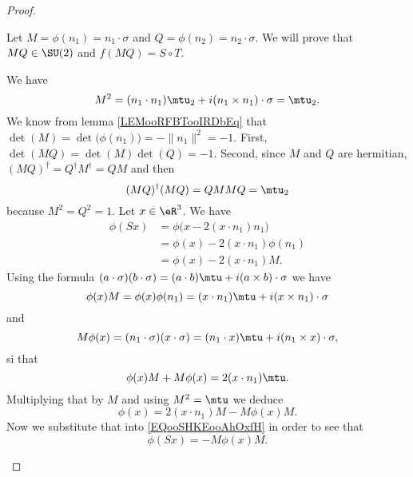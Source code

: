 \begin{proof}
\begin{subproof}
		Let \( M= \phi(n_1) =n_1\cdot \sigma\) and \( Q=\phi(n_2)=n_2\cdot \sigma\). We will prove that \( MQ\in \SU(2)\) and \( f(MQ)=S\circ T\).

		\begin{subproof}
			\spitem[\( M^2=\mtu\)]
			We have
			\begin{equation}
				M^2=(n_1\cdot n_1)\mtu_2+i(n_1\times n_1)\cdot \sigma=\mtu_2.
			\end{equation}
			\spitem[\( \det(M)=-1\)]
			We know from lemma \ref{LEMooRFBTooIRDbEq} that \( \det(M)=\det\big( \phi(n_1) \big)=-\| n_1 \|^2=-1\).
			\spitem[\( MQ\in \SU(2)\)]
			First, \( \det(MQ)=\det(M)\det(Q)=-1\). Second, since \( M\) and \( Q\) are hermitian, \( (MQ)^{\dag}=Q^{\dag}M^{\dag}=QM\) and then
			\begin{equation}
				(MQ)^{\dag}(MQ)=QMMQ=\mtu_2
			\end{equation}
			because \( M^2=Q^2=1\).
			\spitem[\( \phi(Sx)=-M\phi(x)M\)]
			Let \( x\in \eR^3\). We have
			\begin{subequations}        \label{EQooSHKEooAhOxfH}
				\begin{align}
					\phi(Sx) & =\phi\big( x-2(x\cdot n_1)n_1 \big) \\
					         & =\phi(x)-2(x\cdot n_1)\phi(n_1)     \\
					         & =\phi(x)-2(x\cdot n_1)M.
				\end{align}
			\end{subequations}
			Using the formula \( (a\cdot \sigma)(b\cdot \sigma)=(a\cdot b)\mtu+i(a\times b)\cdot \sigma\) we have
			\begin{equation}
				\phi(x)M=\phi(x)\phi(n_1)=(x\cdot n_1)\mtu+i(x\times n_1)\cdot \sigma
			\end{equation}
			and
			\begin{equation}
				M\phi(x)=(n_1\cdot \sigma)(x\cdot \sigma)=(n_1\cdot x)\mtu+i(n_1\times x)\cdot \sigma,
			\end{equation}
			si that
			\begin{equation}
				\phi(x)M+M\phi(x)=2(x\cdot n_1)\mtu.
			\end{equation}
			Multiplying that by \( M\) and using \( M^2=\mtu\) we deduce
			\begin{equation}
				\phi(x)=2(x\cdot n_1)M-M\phi(x)M.
			\end{equation}
			Now we substitute that into \eqref{EQooSHKEooAhOxfH} in order to see that
			\begin{equation}
				\phi(Sx)=-M\phi(x)M.
			\end{equation}

\end{subproof}
\end{subproof}
\end{proof}

